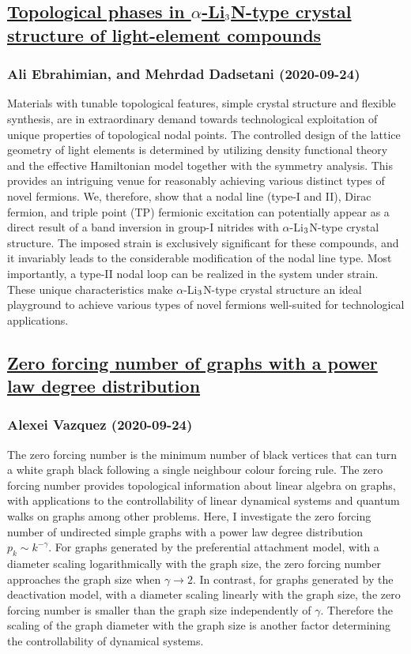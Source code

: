 \subsection*{\href{http://arxiv.org/abs/2009.11941v1}{Topological phases in $α$-Li$_{\rm 3}$N-type crystal structure of  light-element compounds}}
\subsubsection*{Ali Ebrahimian, and Mehrdad Dadsetani (2020-09-24)}
Materials with tunable topological features, simple crystal structure and
flexible synthesis, are in extraordinary demand towards technological
exploitation of unique properties of topological nodal points. The controlled
design of the lattice geometry of light elements is determined by utilizing
density functional theory and the effective Hamiltonian model together with the
symmetry analysis. This provides an intriguing venue for reasonably achieving
various distinct types of novel fermions. We, therefore, show that a nodal line
(type-I and II), Dirac fermion, and triple point (TP) fermionic excitation can
potentially appear as a direct result of a band inversion in group-I nitrides
with $\alpha$-Li$_{\rm 3}$N-type crystal structure. The imposed strain is
exclusively significant for these compounds, and it invariably leads to the
considerable modification of the nodal line type. Most importantly, a type-II
nodal loop can be realized in the system under strain. These unique
characteristics make $\alpha$-Li$_{\rm 3} $N-type crystal structure an ideal
playground to achieve various types of novel fermions well-suited for
technological applications.

\subsection*{\href{http://arxiv.org/abs/2009.11938v1}{Zero forcing number of graphs with a power law degree distribution}}
\subsubsection*{Alexei Vazquez (2020-09-24)}
The zero forcing number is the minimum number of black vertices that can turn
a white graph black following a single neighbour colour forcing rule. The zero
forcing number provides topological information about linear algebra on graphs,
with applications to the controllability of linear dynamical systems and
quantum walks on graphs among other problems. Here, I investigate the zero
forcing number of undirected simple graphs with a power law degree distribution
$p_k\sim k^{-\gamma}$. For graphs generated by the preferential attachment
model, with a diameter scaling logarithmically with the graph size, the zero
forcing number approaches the graph size when $\gamma\rightarrow2$. In
contrast, for graphs generated by the deactivation model, with a diameter
scaling linearly with the graph size, the zero forcing number is smaller than
the graph size independently of $\gamma$. Therefore the scaling of the graph
diameter with the graph size is another factor determining the controllability
of dynamical systems.

